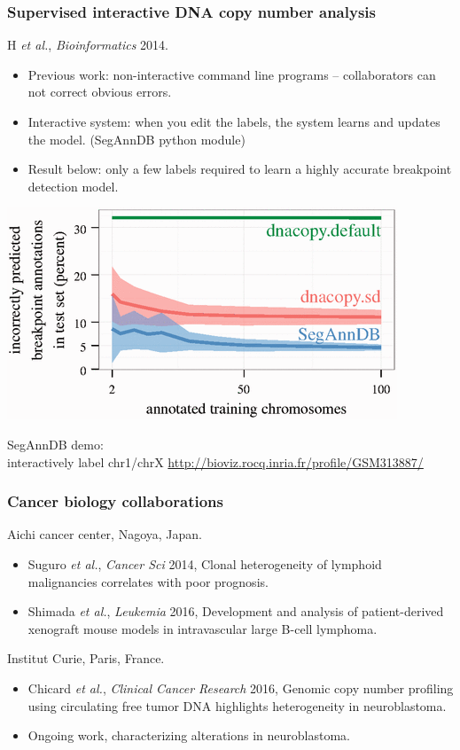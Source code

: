 \documentclass{beamer}
\begin{document}
\begin{frame}
  \frametitle{Supervised interactive DNA copy number analysis}
  H {\it et al.}, {\it Bioinformatics} 2014.

  \begin{itemize}
  \item Previous work: non-interactive command line programs
    -- collaborators can not correct obvious
    errors.
  \item Interactive system: when you edit the labels, the system
    learns and updates the model. (SegAnnDB python module)
  \item Result below: only a few labels required to learn a highly accurate
    breakpoint detection model.
  \end{itemize}
  \begin{minipage}{0.5\linewidth}
    \includegraphics[width=\textwidth]{SegAnnDB-test-error-decreases}
  \end{minipage}
  \begin{minipage}[0.5\linewidth]{0.48\linewidth}
SegAnnDB demo:\\interactively label chr1/chrX
  \url{http://bioviz.rocq.inria.fr/profile/GSM313887/}
  \end{minipage}
\end{frame}

\begin{frame}
  \frametitle{Cancer biology collaborations}
  Aichi cancer center, Nagoya, Japan.
  \begin{itemize}
  \item Suguro {\it et al.}, {\it Cancer Sci} 2014, Clonal
    heterogeneity of lymphoid malignancies correlates with poor
    prognosis.
  \item Shimada {\it et al.}, {\it Leukemia} 2016, Development and
    analysis of patient-derived xenograft mouse models in
    intravascular large B-cell lymphoma.
  \end{itemize}
  Institut Curie, Paris, France.
  \begin{itemize}
  \item Chicard {\it et al.}, {\it Clinical Cancer Research} 2016,
    Genomic copy number profiling using circulating free tumor DNA
    highlights heterogeneity in neuroblastoma.
  \item Ongoing work, characterizing alterations in neuroblastoma.
  \end{itemize}
\end{frame}
\end{document}
